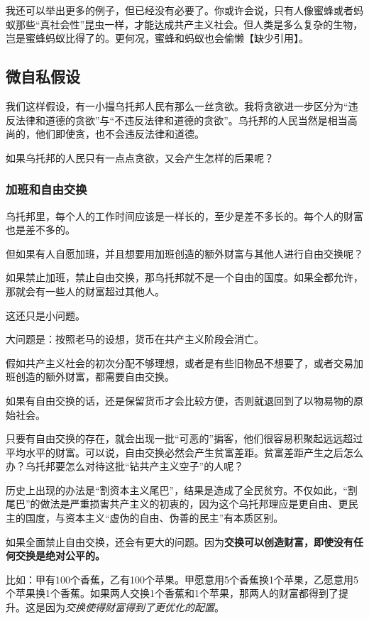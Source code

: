我还可以举出更多的例子，但已经没有必要了。你或许会说，只有人像蜜蜂或者蚂蚁那些“真社会性”昆虫一样，才能达成共产主义社会。但人类是多么复杂的生物，岂是蜜蜂蚂蚁比得了的。更何况，蜜蜂和蚂蚁也会偷懒【缺少引用】。

\subsection{微自私假设}

我们这样假设，有一小撮乌托邦人民有那么一丝贪欲。我将贪欲进一步区分为“违反法律和道德的贪欲”与“不违反法律和道德的贪欲”。乌托邦的人民当然是相当高尚的，他们即使贪，也不会违反法律和道德。

如果乌托邦的人民只有一点点贪欲，又会产生怎样的后果呢？

\subsubsection{加班和自由交换}

乌托邦里，每个人的工作时间应该是一样长的，至少是差不多长的。每个人的财富也是差不多的。

但如果有人自愿加班，并且想要用加班创造的额外财富与其他人进行自由交换呢？

如果禁止加班，禁止自由交换，那乌托邦就不是一个自由的国度。如果全都允许，那就会有一些人的财富超过其他人。

这还只是小问题。

\zPar

大问题是：按照老马的设想，货币在共产主义阶段会消亡。

假如共产主义社会的初次分配不够理想，或者是有些旧物品不想要了，或者交易加班创造的额外财富，都需要自由交换。

如果有自由交换的话，还是保留货币才会比较方便，否则就退回到了以物易物的原始社会。

只要有自由交换的存在，就会出现一批“可恶的”掮客，他们很容易积聚起远远超过平均水平的财富。可以说，自由交换必然会产生贫富差距。贫富差距产生之后怎么办？乌托邦要怎么对待这批“钻共产主义空子”的人呢？

历史上出现的办法是“割资本主义尾巴”，结果是造成了全民贫穷。不仅如此，“割尾巴”的做法是严重损害共产主义的初衷的，因为这个乌托邦理应是更自由、更民主的国度，与资本主义“虚伪的自由、伪善的民主”有本质区别。

\zPar

如果全面禁止自由交换，还会有更大的问题。因为\textbf{交换可以创造财富，即使没有任何交换是绝对公平的。}

比如：甲有100个香蕉，乙有100个苹果。甲愿意用5个香蕉换1个苹果，乙愿意用5个苹果换1个香蕉。如果两人交换1个香蕉和1个苹果，那两人的财富都得到了提升。这是因为\emph{交换使得财富得到了更优化的配置}。

